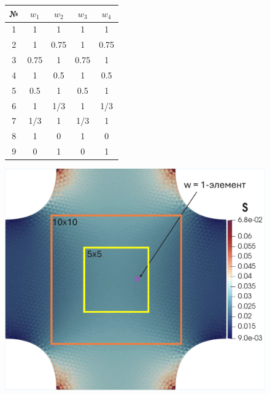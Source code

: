 \begin{figure}[H]
  \centering
  \begin{minipage}[t]{0.48\textwidth}
    \centering
    \vspace{0pt}
    \begin{tabular}{|c|c|c|c|c|}
    \hline
    \textbf{№} & $w_1$ & $w_2$ & $w_3$ & $w_4$ \\
    \hline
    1 & 1 & 1 & 1 & 1 \\
    2 & 1 & 0.75 & 1 & 0.75 \\
    3 & 0.75 & 1 & 0.75 & 1 \\
    4 & 1 & 0.5 & 1 & 0.5 \\
    5 & 0.5 & 1 & 0.5 & 1 \\
    6 & 1 & 1/3 & 1 & 1/3 \\
    7 & 1/3 & 1 & 1/3 & 1 \\
    8 & 1 & 0 & 1& 0 \\
    9 & 0 & 1 & 0 & 1 \\
    \hline
    \end{tabular}
    \label{tab:test_protocols}
  \end{minipage}\hfill
  \begin{minipage}[t]{0.48\textwidth}
    \centering
    \vspace{0pt}
    \includegraphics[width=\linewidth]{img/Numerical/malt_window.pdf}
    \label{fig:malt_window}
  \end{minipage}
\end{figure}

